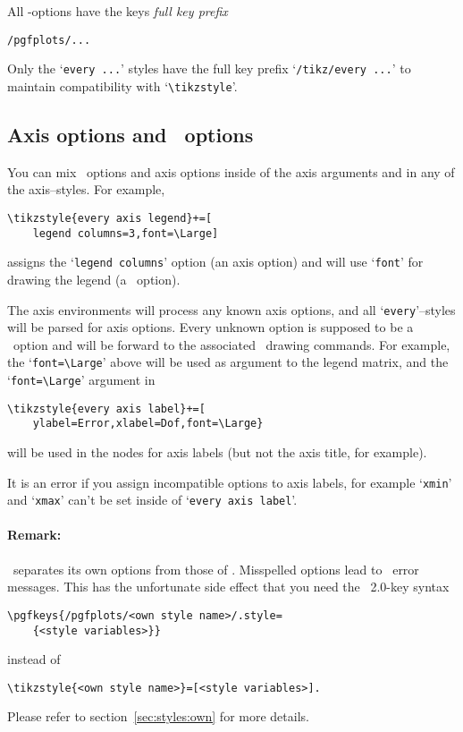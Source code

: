 All \PGFPlots-options have the {\PGF}keys \emph{full key prefix}
\begin{lstlisting}
/pgfplots/...
\end{lstlisting}
Only the `\texttt{every ...}' styles have the full key prefix `\texttt{/tikz/every ...}' to maintain compatibility with `\lstinline!\tikzstyle!'.


\subsection{Axis options and \Tikz\ options}
You can mix \Tikz\ options and axis options inside of the axis arguments and in any of the axis--styles. For example,
\begin{lstlisting}
\tikzstyle{every axis legend}+=[
	legend columns=3,font=\Large]
\end{lstlisting}
assigns the `\texttt{legend columns}' option (an axis option) and will use `\texttt{font}' for drawing the legend (a \Tikz\ option).

The axis environments will process any known axis options, and all `\texttt{every}'--styles will be parsed for axis options. Every unknown option is supposed to be a \Tikz\ option and will be forward to the associated \Tikz\ drawing commands. For example, the `\lstinline{font=\Large}' above will be used as argument to the legend matrix, and the `\lstinline{font=\Large}' argument in 
\begin{lstlisting}
\tikzstyle{every axis label}+=[
	ylabel=Error,xlabel=Dof,font=\Large}
\end{lstlisting}
will be used in the nodes for axis labels (but not the axis title, for example).

It is an error if you assign incompatible options to axis labels, for example `\texttt{xmin}' and `\texttt{xmax}' can't be set inside of `\texttt{every axis label}'.

\paragraph{Remark:} \PGFPlots\ separates its own options from those of \Tikz. Misspelled options lead to \Tikz\ error messages. This has the unfortunate side effect that you need the \PGF\ 2.0-key syntax
\begin{lstlisting}
\pgfkeys{/pgfplots/<own style name>/.style=
	{<style variables>}}
\end{lstlisting}
instead of
\begin{lstlisting}
\tikzstyle{<own style name>}=[<style variables>].
\end{lstlisting}
Please refer to section~\ref{sec:styles:own} for more details.



